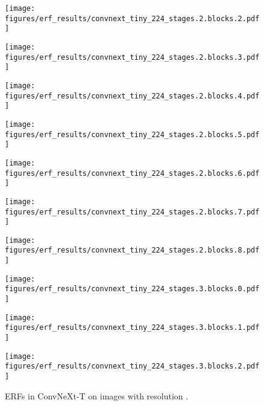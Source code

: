 \documentclass{article}
\begin{document}
\begin{figure}[tb]
\begin{minipage}[t]{0.13\hsize}
    \texttt{[image: figures/erf\_results/convnext\_tiny\_224\_stages.2.blocks.2.pdf]}
    \label{figure:erf_convnext:8}
  \end{minipage}
  \begin{minipage}[t]{0.13\hsize}
    \centering
    \texttt{[image: figures/erf\_results/convnext\_tiny\_224\_stages.2.blocks.3.pdf]}
    \label{figure:erf_convnext:9}
  \end{minipage}
  \begin{minipage}[t]{0.13\hsize}
    \centering
    \texttt{[image: figures/erf\_results/convnext\_tiny\_224\_stages.2.blocks.4.pdf]}
    \label{figure:erf_convnext:10}
  \end{minipage}
  \begin{minipage}[t]{0.13\hsize}
    \centering
    \texttt{[image: figures/erf\_results/convnext\_tiny\_224\_stages.2.blocks.5.pdf]}
    \label{figure:erf_convnext:11}
  \end{minipage}
  \begin{minipage}[t]{0.13\hsize}
    \centering
    \texttt{[image: figures/erf\_results/convnext\_tiny\_224\_stages.2.blocks.6.pdf]}
    \label{figure:erf_convnext:12}
  \end{minipage}
  \begin{minipage}[t]{0.13\hsize}
    \centering
    \texttt{[image: figures/erf\_results/convnext\_tiny\_224\_stages.2.blocks.7.pdf]}
    \label{figure:erf_convnext:13}
  \end{minipage}
  \begin{minipage}[t]{0.13\hsize}
    \centering
    \texttt{[image: figures/erf\_results/convnext\_tiny\_224\_stages.2.blocks.8.pdf]}
    \label{figure:erf_convnext:14}
  \end{minipage}
  \begin{minipage}[t]{0.13\hsize}
    \centering
    \texttt{[image: figures/erf\_results/convnext\_tiny\_224\_stages.3.blocks.0.pdf]}
    \label{figure:erf_convnext:15}
  \end{minipage}
  \begin{minipage}[t]{0.13\hsize}
    \centering
    \texttt{[image: figures/erf\_results/convnext\_tiny\_224\_stages.3.blocks.1.pdf]}
    \label{figure:erf_convnext:16}
  \end{minipage}
  \begin{minipage}[t]{0.13\hsize}
    \centering
    \texttt{[image: figures/erf\_results/convnext\_tiny\_224\_stages.3.blocks.2.pdf]}
    \label{figure:erf_convnext:17}
  \end{minipage}
  \caption{ERFs in ConvNeXt-T \cite{liu2022convnet} on images with resolution .}
    \label{figure:erf_convnext}
\end{figure} 
\end{document}
